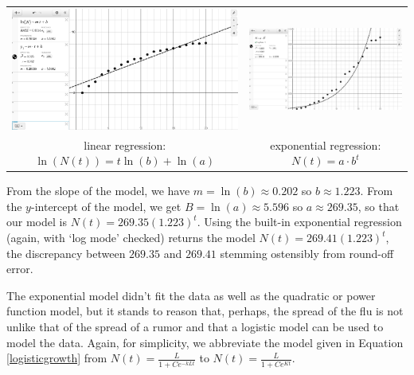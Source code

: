 \documentclass{ximera}
\begin{document}
\begin{center}

\begin{tabular}{cc}

\includegraphics[width=3in]{./ApplicationsofExponentialandLogarithmicFunctionsGraphics/ExpLogAppEx09.jpg} &

\includegraphics[width=3in]{./ApplicationsofExponentialandLogarithmicFunctionsGraphics/ExpLogAppEx07a.jpg} \\

linear regression: $\ln(N(t)) = t \ln(b) + \ln(a)$ &

exponential regression: $N(t) = a \cdot b^{t}$ \\

\end{tabular}

\end{center}

From the slope of the model, we have   $m = \ln(b) \approx 0.202$  so $b \approx 1.223$.  From the $y$-intercept of the model, we get $B = \ln(a) \approx  5.596$ so $a \approx 269.35$, so that our model is $N(t) = 269.35(1.223)^{t}$. Using the built-in exponential regression (again, with `log mode' checked) returns the model  $N(t) = 269.41 (1.223)^{t}$, the discrepancy between   $269.35$ and $269.41$ stemming ostensibly from round-off error.    

\smallskip

The exponential model didn't fit the data as well as the quadratic or power function model, but it stands to reason that, perhaps, the spread of the flu is not unlike that of the spread of a rumor and that a logistic model can be used to model the data.  Again, for simplicity, we abbreviate the model given in Equation \ref{logisticgrowth} from $N(t) =\frac{L}{1 + Ce^{-kLt}}$ to $N(t) = \frac{L}{1 + Ce^{Kt}}$.
\end{document}
